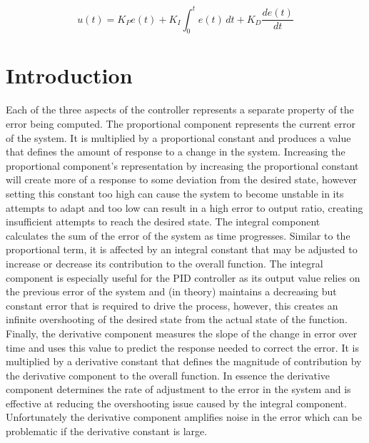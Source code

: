 \begin{equation}\label{pid-function}
u(t) = K_{P} e(t) + K_{I} \int_0^t e(t)\,dt + K_{D} \frac{d e(t)}{dt}
\end{equation}

\section{Introduction}\label{section_one}
Each of the three aspects of the controller represents a separate property of the error being computed. The proportional component represents the current error of the system. It is multiplied by a proportional constant and produces a value that defines the amount of response to a change in the system. Increasing the proportional component’s representation by increasing the proportional constant will create more of a response to some deviation from the desired state, however setting this constant too high can cause the system to become unstable in its attempts to adapt and too low can result in a high error to output ratio, creating insufficient attempts to reach the desired state. The integral component calculates the sum of the error of the system as time progresses. Similar to the proportional term, it is affected by an integral constant that may be adjusted to increase or decrease its contribution to the overall function. The integral component is especially useful for the PID controller as its output value relies on the previous error of the system and (in theory) maintains a decreasing but constant error that is required to drive the process, however, this creates an infinite overshooting of the desired state from the actual state of the function. Finally, the derivative component measures the slope of the change in error over time and uses this value to predict the response needed to correct the error. It is multiplied by a derivative constant that defines the magnitude of contribution by the derivative component to the overall function. In essence the derivative component determines the rate of adjustment to the error in the system and is effective at reducing the overshooting issue caused by the integral component. Unfortunately the derivative component amplifies noise in the error which can be problematic if the derivative constant is large. 